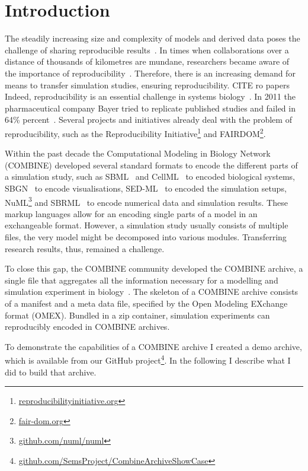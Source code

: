 
\section{Introduction}
\label{sec:intro}

The steadily increasing size and complexity of models and derived data poses the challenge of sharing reproducible results~\cite{scharm2014}.
In times when collaborations over a distance of thousands of kilometres are mundane, researchers became aware of the importance of reproducibility~\cite{Sandve2013}.
Therefore, there is an increasing demand for means to transfer simulation studies, ensuring reproducibility. CITE ro papers
Indeed, reproducibility is an essential challenge in systems biology~\cite{Mesirov2010}.
In 2011 the pharmaceutical company Bayer tried to replicate published studies and failed in 64\% percent~\cite{Prinz2011}.
Several projects and initiatives already deal with the problem of reproducibility, such as the Reproducibility Initiative\footnote{\href{http://reproducibilityinitiative.org/}{reproducibilityinitiative.org}} and FAIRDOM\footnote{\href{http://fair-dom.org/}{fair-dom.org}}.

Within the past decade the Computational Modeling in Biology Network (COMBINE) developed several standard formats to encode the different parts of a simulation study, such as SBML~\cite{Hucka2003} and CellML~\cite{Cuellar2003a} to encoded biological systems, SBGN~\cite{sbgn} to encode visualisations, SED-ML~\cite{Waltemath2011} to encoded the simulation setups, NuML\footnote{\href{https://github.com/numl/numl}{github.com/numl/numl}} and SBRML~\cite{Dada2010} to encode numerical data and simulation results.
These markup languages allow for an encoding single parts of a model in an exchangeable format.
However, a simulation study usually consists of multiple files, the very model might be decomposed into various modules.
Transferring research results, thus, remained a challenge.

To close this gap, the COMBINE community developed the COMBINE archive, a single file that aggregates all the information necessary for a modelling and simulation experiment in biology~\cite{Bergmann2014}.
The skeleton of a COMBINE archive consists of a manifest and a meta data file, specified by the Open Modeling EXchange format (OMEX).
Bundled in a zip container, simulation experiments can reproducibly encoded in COMBINE archives.

To demonstrate the capabilities of a COMBINE archive I created a demo archive, which is available from our GitHub project\footnote{\href{https://github.com/SemsProject/CombineArchiveShowCase}{github.com/SemsProject/CombineArchiveShowCase}}.
In the following I describe what I did to build that archive.

